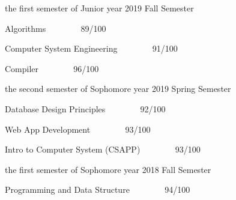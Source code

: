 
\begin{cventries}

  \cventry
    {the first semester of Junior year} %
    {2019 Fall Semester} %
    {} %
    {} %
    {
      \begin{cvitems} %
        \item {Algorithms ~~~~~~~ 89/100}
        \item {Computer System Engineering ~~~~~~~ 91/100}
        \item {Compiler ~~~~~~~ 96/100}
      \end{cvitems}
    }

  \cventry
    {the second semester of Sophomore year} %
    {2019 Spring Semester} %
    {} %
    {} %
    {
      \begin{cvitems} %
        \item {Database Design Principles ~~~~~~~ 92/100}
        \item {Web App Development ~~~~~~~ 93/100}
        \item {Intro to Computer System (CSAPP) ~~~~~~~ 93/100}
      \end{cvitems}
    }

  \cventry
    {the first semester of Sophomore year} %
    {2018 Fall Semester} %
    {} %
    {} %
    {
      \begin{cvitems} %
        \item {Programming and Data Structure ~~~~~~~ 94/100}
      \end{cvitems}
    }

\end{cventries}
